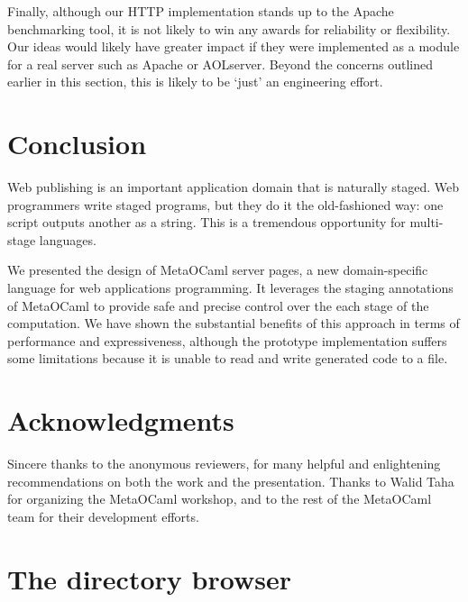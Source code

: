 \documentclass{elsart}
\def\MOC{MetaOCaml\xspace}
\begin{document}
Finally, although our HTTP implementation stands up to the Apache
benchmarking tool, it is not likely to win any awards for reliability
or flexibility.  Our ideas would likely have greater impact if they
were implemented as a module for a real server such as Apache or
AOLserver.  Beyond the concerns outlined earlier in this section, this
is likely to be `just' an engineering effort.


\section{Conclusion}
\label{sec:concl}

Web publishing is an important application domain that is naturally
staged.  Web programmers write staged programs, but they do it the
old-fashioned way: one script outputs another as a string.  This is a
tremendous opportunity for multi-stage languages.

We presented the design of \MOC server pages, a new
domain-specific language for web applications programming.  It
leverages the staging annotations of \MOC to provide safe and
precise control over the each stage of the computation.
We have shown the substantial benefits of this approach in terms
of performance and expressiveness, although the prototype
implementation suffers some limitations because it is unable to
read and write generated code to a file.

\section*{Acknowledgments}

Sincere thanks to the anonymous reviewers, for many helpful and
enlightening recommendations on both the work and the presentation.
Thanks to Walid Taha for organizing the \MOC workshop, and to the rest
of the \MOC team for their development efforts.



\appendix
\section{The directory browser}
\label{sec:dir.meta}
\setcodefonts{11pt}{10pt}
\LGindent=8pt
\gdef\lgcommentstart{\end{lgrind}\vskip-3pt}
\def\lgcommentend{\vskip.5\baselineskip\begin{lgrind}}

\begin{lgrind}
\relax\end{lgrind}
\end{document}
